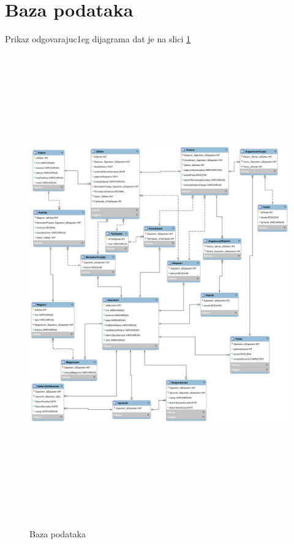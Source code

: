 \documentclass[10 pt]{article}
\begin{document}
	
	\section{Baza podataka}
		
		Prikaz odgovarajuc1eg dijagrama dat je na slici \ref{fig:BazaPodataka}
		
		\begin{figure}[H]
			\centering
			\includegraphics[width=15cm,height=20cm,keepaspectratio]{slike/baza.png}\\
			\caption{Baza podataka}
			\label{fig:BazaPodataka}
		\end{figure}

	
\end{document}
